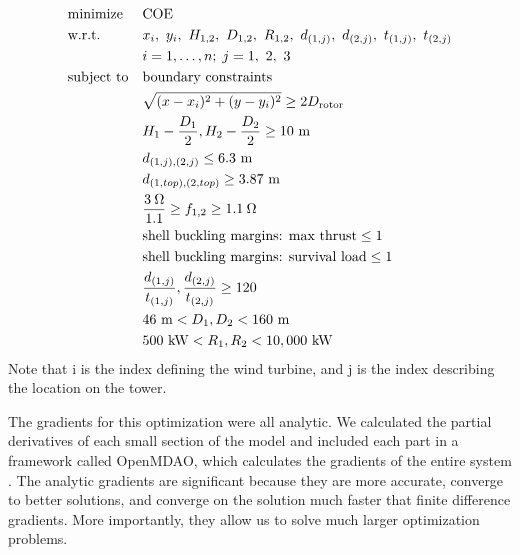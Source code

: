         
        \begin{equation}
			\begin{aligned}
				& \text{minimize}
					& & \text{COE} \\
                & \text{w.r.t.} 
                	&& x_i,~ y_i,~ H_{1,2},~ D_{1,2},~ R_{1,2},~ d_{(1,j)},~ d_{(2,j)},~ t_{(1,j)},~t_{(2,j)}\\
                		&&& i = 1, \ldots, n; \; j = 1,~2,~3 \\
				& \text{subject to}
					& & \text{boundary constraints} \\
						&&& \sqrt{(x-x_i)^2+(y-y_i)^2} \geq 2D_{\text{rotor}} \\
						&&& H_1-\frac{D_1}{2}, H_2-\frac{D_2}{2} \geq 10~ \text{m}\\
                		&&& d_{(1,j),(2,j)} \leq 6.3~ \text{m}\\
                		&&& d_{(1,top),(2,top)} \geq 3.87~ \text{m}\\
						&&& \frac{3\hspace{0.08cm}\Omega}{1.1} \geq f_{1,2} \geq 1.1\hspace{0.08cm}\Omega \\
                		&&& \text{shell buckling margins: max thrust} \leq 1 \\
                        &&& \text{shell buckling margins: survival load} \leq 1 \\
                		&&& \frac{d_{(1,j)}}{t_{(1,j)}},\frac{d_{(2,j)}}{t_{(2,j)}} \geq 120\\
                        &&& 46~ \text{m} < D_1,D_2 < 160~ \text{m}  \\
                        &&& 500~ \text{kW} < R_1,R_2 < 10,000~ \text{kW} \\
			\end{aligned}
		\end{equation}
%
Note that i is the index defining the wind turbine, and j is the index describing the location on the tower.
        
        The gradients for this optimization were all analytic. We calculated the partial derivatives of each small section of the model and included each part in a framework called OpenMDAO, which calculates the gradients of the entire system \citep{gray2010openmdao}. The analytic gradients are significant because they are more accurate, converge to better solutions, and converge on the solution much faster that finite difference gradients. More importantly, they allow us to solve much larger optimization problems. %
        
